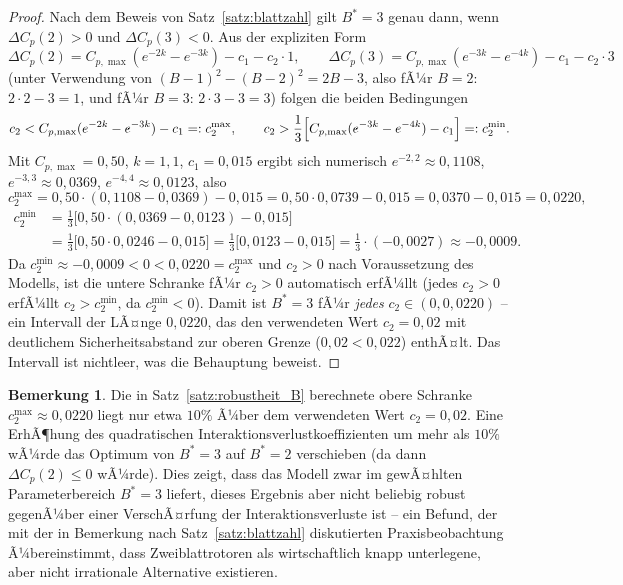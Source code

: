 ﻿\documentclass[a4paper,12pt]{article}
\theoremstyle{definition}
\newtheorem{bemerkung}{Bemerkung}
\begin{document}
\begin{proof}
Nach dem Beweis von Satz~\ref{satz:blattzahl} gilt $B^*=3$ genau dann, wenn $\Delta C_p(2)>0$ und $\Delta C_p(3)<0$. Aus der expliziten Form
\[
\Delta C_p(2) = C_{p,\max}\left(e^{-2k}-e^{-3k}\right) - c_1 - c_2\cdot 1, \qquad
\Delta C_p(3) = C_{p,\max}\left(e^{-3k}-e^{-4k}\right) - c_1 - c_2\cdot 3
\]
(unter Verwendung von $(B-1)^2-(B-2)^2 = 2B-3$, also fÃ¼r $B=2$: $2\cdot2-3=1$, und fÃ¼r $B=3$: $2\cdot3-3=3$) folgen die beiden Bedingungen
\[
c_2 < C_{p,\max}(e^{-2k}-e^{-3k}) - c_1 =: c_2^{\max}, \qquad
c_2 > \frac{1}{3}\Bigl[C_{p,\max}(e^{-3k}-e^{-4k}) - c_1\Bigr] =: c_2^{\min}.
\]
Mit $C_{p,\max}=0{,}50$, $k=1{,}1$, $c_1=0{,}015$ ergibt sich numerisch $e^{-2{,}2}\approx0{,}1108$, $e^{-3{,}3}\approx0{,}0369$, $e^{-4{,}4}\approx0{,}0123$, also
\[
c_2^{\max} = 0{,}50\cdot(0{,}1108-0{,}0369) - 0{,}015 = 0{,}50\cdot0{,}0739-0{,}015 = 0{,}0370-0{,}015 = 0{,}0220,
\]
\begin{align*}
c_2^{\min} &= \tfrac{1}{3}\bigl[0{,}50\cdot(0{,}0369-0{,}0123)-0{,}015\bigr] \\
&= \tfrac{1}{3}\bigl[0{,}50\cdot0{,}0246-0{,}015\bigr] = \tfrac{1}{3}\bigl[0{,}0123-0{,}015\bigr] = \tfrac{1}{3}\cdot(-0{,}0027) \approx -0{,}0009.
\end{align*}
Da $c_2^{\min}\approx-0{,}0009 < 0 < 0{,}0220 = c_2^{\max}$ und $c_2>0$ nach Voraussetzung des Modells, ist die untere Schranke fÃ¼r $c_2>0$ automatisch erfÃ¼llt (jedes $c_2>0$ erfÃ¼llt $c_2>c_2^{\min}$, da $c_2^{\min}<0$). Damit ist $B^*=3$ fÃ¼r \emph{jedes} $c_2\in(0, 0{,}0220)$ -- ein Intervall der LÃ¤nge $0{,}0220$, das den verwendeten Wert $c_2=0{,}02$ mit deutlichem Sicherheitsabstand zur oberen Grenze ($0{,}02<0{,}022$) enthÃ¤lt. Das Intervall ist nichtleer, was die Behauptung beweist. \qedhere
\end{proof}

\begin{bemerkung}
Die in Satz~\ref{satz:robustheit_B} berechnete obere Schranke $c_2^{\max}\approx0{,}0220$ liegt nur etwa $10\%$ Ã¼ber dem verwendeten Wert $c_2=0{,}02$. Eine ErhÃ¶hung des quadratischen Interaktionsverlustkoeffizienten um mehr als $10\%$ wÃ¼rde das Optimum von $B^*=3$ auf $B^*=2$ verschieben (da dann $\Delta C_p(2)\le0$ wÃ¼rde). Dies zeigt, dass das Modell zwar im gewÃ¤hlten Parameterbereich $B^*=3$ liefert, dieses Ergebnis aber nicht beliebig robust gegenÃ¼ber einer VerschÃ¤rfung der Interaktionsverluste ist -- ein Befund, der mit der in Bemerkung nach Satz~\ref{satz:blattzahl} diskutierten Praxisbeobachtung Ã¼bereinstimmt, dass Zweiblattrotoren als wirtschaftlich knapp unterlegene, aber nicht irrationale Alternative existieren.
\end{bemerkung}
\end{document}
